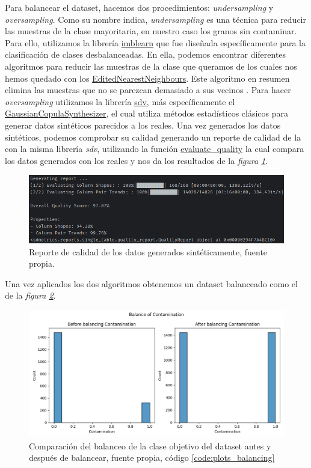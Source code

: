 Para balancear el \gls{dataset}, hacemos dos procedimientos: \textit{undersampling} y \textit{oversampling}. Como su nombre indica, \textit{undersampling} es una técnica para reducir las muestras de la clase mayoritaria, en nuestro caso los granos sin contaminar. Para ello, utilizamos la librería \href{https://imbalanced-learn.org/stable/}{imblearn} que fue diseñada específicamente para la clasificación de clases desbalanceadas. En ella, podemos encontrar diferentes algoritmos para reducir las muestras de la clase que queramos de los cuales nos hemos quedado con los \href{https://imbalanced-learn.org/stable/references/generated/imblearn.under_sampling.EditedNearestNeighbours.html}{EditedNearestNeighbours}. Este algoritmo en resumen elimina las muestras que no se parezcan demasiado a sus vecinos \cite{Wil72}. Para hacer \textit{oversampling} utilizamos la librería \href{https://sdv.dev/}{sdv}, más específicamente el \href{https://docs.sdv.dev/sdv/single-table-data/modeling/synthesizers/gaussiancopulasynthesizer}{GaussianCopulaSynthesizer}, el cual utiliza métodos estadísticos clásicos para generar datos sintéticos parecidos a los reales. Una vez generados los datos sintéticos, podemos comprobar su calidad generando un reporte de calidad de la con la misma librería \textit{sdv}, utilizando la función \href{https://docs.sdv.dev/sdv/single-table-data/evaluation#evaluate_quality}{evaluate\_quality} la cual compara los datos generados con los reales y nos da los resultados de la \textit{figura \ref{fig:quality_report}}.

\begin{figure}[!ht]
    \centering
    \includegraphics[width=0.8\linewidth]{media/images/quality_report.png}
    \caption{Reporte de calidad de los datos generados sintéticamente, fuente propia.}
    \label{fig:quality_report}
\end{figure}

Una vez aplicados los dos algoritmos obtenemos un \gls{dataset} balanceado como el de la \textit{figura \ref{fig:balance}}.

\begin{figure}[!ht]
    \centering
    \includegraphics[width=0.6\linewidth]{media/images/balance.png}
    \caption{Comparación del balanceo de la clase objetivo del \gls{dataset} antes y después de balancear, fuente propia, código \ref{code:plots_balancing}}
    \label{fig:balance}
\end{figure}